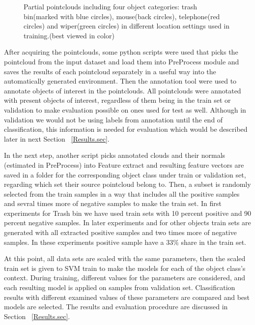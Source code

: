 \begin{figure} [htp]
\begin{center}
  \end{center}
  \caption[Train set pointclouds including four different object class.]
  {Partial pointclouds including four object categories: trash bin(marked with blue circles), mouse(back circles), telephone(red circles) and wiper(green circles) in different location settings used in training.(best viewed in color)}
  \label{TrainClouds2.figure:edge}
\end{figure}




After acquiring the pointclouds, some python scripts were used that picks the pointcloud from the input dataset 
and load them into PreProcess module and saves the results of each pointcloud separately in a useful way into the automatically
generated environment. 
Then the annotation tool were used to annotate objects of interest in the pointclouds. 
All pointclouds were annotated with present objects of interest, regardless of them being in the train set or validation to 
make evaluation possible on ones used for test as well. 
Although in validation we would not be using labels from annotation until the end of classification, 
this information is needed for evaluation which would be described later in next Section ~\ref{Results.sec}.


In the next step, another script picks annotated clouds and their normals (estimated in PreProcess) into Feature extract 
and  resulting feature vectors are saved in a folder for the corresponding object class under train or validation set, regarding
which set their source pointcloud belong to.
Then, a subset is randomly selected from the train samples in a way that includes all the positive samples and sevral times more of 
 negative samples to make the train set.
In first experiments for Trash bin we have used train sets with 10 percent positive and 90 percent negative samples.
In later experiments and for other objects train sets are generated with all extracted positive samples and two times more of negative samples.
In these experiments positive sample have a 33\% share in the train set.

At this point, all data sets are scaled with the same parameters, then the scaled train set is given to SVM train 
to make the models for each of the object class's context. 
During training, different values for the parameters are considered, and each resulting model is applied on samples from validation
set. 
Classification results with different examined values of these parameters are compared and best models are selected. 
The results and evaluation procedure are discussed in Section ~\ref{Results.sec}.

